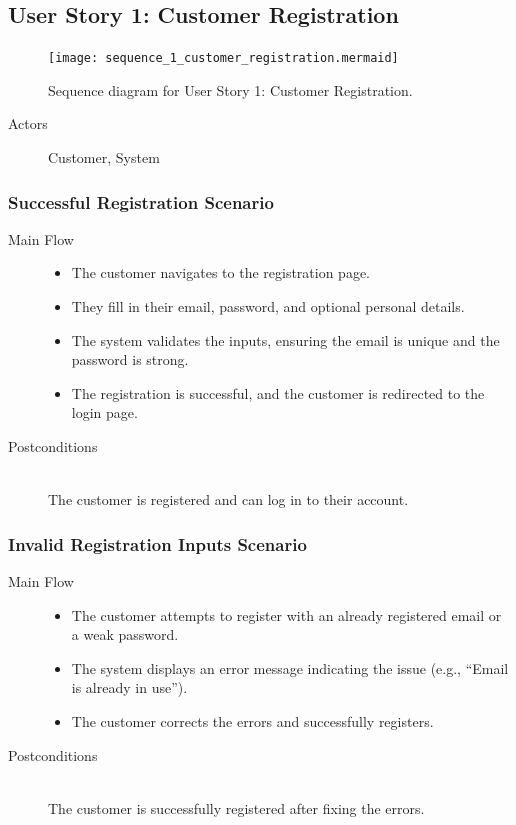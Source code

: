 \documentclass[twoside,a4paper,journal]{IEEEtran}
\begin{document}
\subsection{User Story 1: Customer Registration}
\begin{figure}[!t]
\centering
\texttt{[image: sequence\_1\_customer\_registration.mermaid]}
\caption{Sequence diagram for User Story 1: Customer Registration.}
\label{fig:sequence_1}
\end{figure}
\begin{description}
  \item[Actors] Customer, System
\end{description}
\subsubsection{Successful Registration Scenario}
\begin{description}
  \item[Main Flow] \hfill
    \begin{itemize}
      \item The customer navigates to the registration page.
      \item They fill in their email, password, and optional personal details.
      \item The system validates the inputs, ensuring the email is unique and the
        password is strong.
      \item The registration is successful, and the customer is redirected to the
        login page.
    \end{itemize}
  \item[Postconditions] \hfill \\
    The customer is registered and can log in to their account.
\end{description}
\subsubsection{Invalid Registration Inputs Scenario}
\begin{description}
  \item[Main Flow] \hfill
    \begin{itemize}
      \item The customer attempts to register with an already registered email
        or a weak password.
      \item The system displays an error message indicating the issue
        (e.g., ``Email is already in use'').
      \item The customer corrects the errors and successfully registers.
    \end{itemize}
  \item[Postconditions] \hfill \\
    The customer is successfully registered after fixing the errors.
\end{description}
\end{document}
